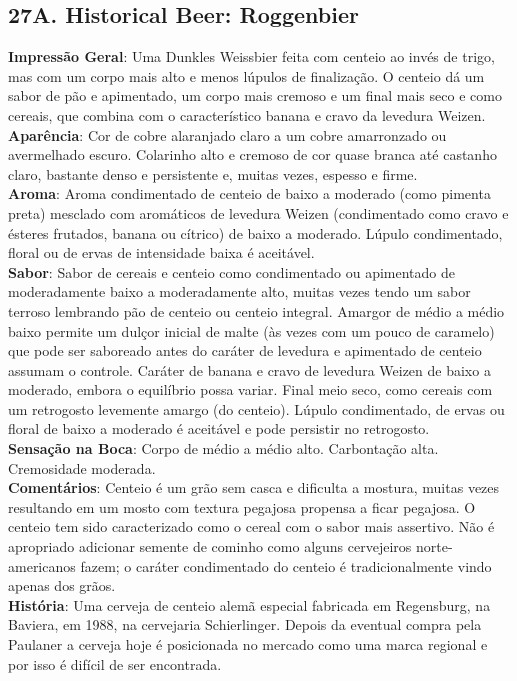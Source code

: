 \subsection*{27A. Historical Beer: Roggenbier}
\textbf{Impressão Geral}: Uma Dunkles Weissbier feita com centeio ao invés de trigo, mas com um corpo mais alto e menos lúpulos de finalização. O centeio dá um sabor de pão e apimentado, um corpo mais cremoso e um final mais seco e como cereais, que combina com o característico banana e cravo da levedura Weizen. \\
\textbf{Aparência}: Cor de cobre alaranjado claro a um cobre amarronzado ou avermelhado escuro. Colarinho alto e cremoso de cor quase branca até castanho claro, bastante denso e persistente e, muitas vezes, espesso e firme. \\
\textbf{Aroma}: Aroma condimentado de centeio de baixo a moderado (como pimenta preta) mesclado com aromáticos de levedura Weizen (condimentado como cravo e ésteres frutados, banana ou cítrico) de baixo a moderado. Lúpulo condimentado, floral ou de ervas de intensidade baixa é aceitável. \\
\textbf{Sabor}: Sabor de cereais e centeio como condimentado ou apimentado de moderadamente baixo a moderadamente alto, muitas vezes tendo um sabor terroso lembrando pão de centeio ou centeio integral. Amargor de médio a médio baixo permite um dulçor inicial de malte (às vezes com um pouco de caramelo) que pode ser saboreado antes do caráter de levedura e apimentado de centeio assumam o controle. Caráter de banana e cravo de levedura Weizen de baixo a moderado, embora o equilíbrio possa variar. Final meio seco, como cereais com um retrogosto levemente amargo (do centeio). Lúpulo condimentado, de ervas ou floral de baixo a moderado é aceitável e pode persistir no retrogosto. \\
\textbf{Sensação na Boca}: Corpo de médio a médio alto. Carbontação alta. Cremosidade moderada. \\
\textbf{Comentários}: Centeio é um grão sem casca e dificulta a mostura, muitas vezes resultando em um mosto com textura pegajosa propensa a ficar pegajosa. O centeio tem sido caracterizado como o cereal com o sabor mais assertivo. Não é apropriado adicionar semente de cominho como alguns cervejeiros norte-americanos fazem; o caráter condimentado do centeio é tradicionalmente vindo apenas dos grãos. \\
\textbf{História}: Uma cerveja de centeio alemã especial fabricada em Regensburg, na Baviera, em 1988, na cervejaria Schierlinger. Depois da eventual compra pela Paulaner a cerveja hoje é posicionada no mercado como uma marca regional e por isso é difícil de ser encontrada. \\
